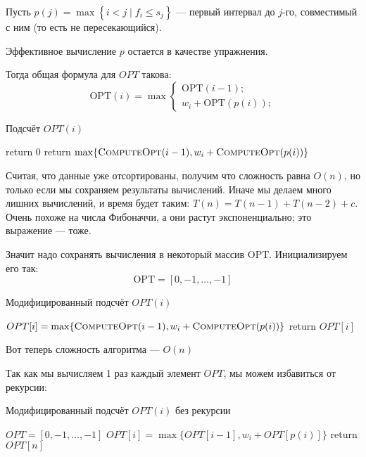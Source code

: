 Пусть $p(j) = \max\left\{ i<j \mid f_{i}\leqslant s_j\right\}$ --- первый интервал до $j$-го, совместимый с ним (то есть не пересекающийся).

Эффективное вычисление $p$ остается в качестве упражнения.

Тогда общая формула для $OPT$ такова:
\[
    \mathrm{OPT}(i) = \max\begin{cases}
        \mathrm{OPT}(i-1);\\
        w_i+ \mathrm{OPT}(p(i));
    \end{cases}
\]


\begin{algorithm}
	\caption{Подсчёт $OPT(i)$}
	\begin{algorithmic}[1]
				\State return 0
			\EndIf
			\State return \(\max \{\textsc{ComputeOpt}(i - 1), w_i + \textsc{ComputeOpt}(p(i))\}\)
		\EndFunction
	\end{algorithmic}
\end{algorithm}

Считая, что данные уже отсортированы, получим что сложность равна $O(n)$, но только если мы сохраняем результаты вычислений.
Иначе мы делаем много лишних вычислений, и время будет таким: $T(n) = T(n-1)+T(n-2)+c$.
Очень похоже на числа Фибоначчи, а они растут экспоненциально; это выражение --- тоже.


Значит надо сохранять вычисления в некоторый массив OPT.
Инициализируем его так: 
\[
\mathrm{OPT} = [0, -1, \ldots, -1]
\]

\begin{algorithm}
	\caption{Модифицированный подсчёт $OPT(i)$}
	\begin{algorithmic}[1]
				\State \(OPT[i] = \max \{\textsc{ComputeOpt}(i - 1), w_i + \textsc{ComputeOpt}(p(i))\}\)
			\EndIf
			\State return \(OPT[i]\)
		\EndFunction
	\end{algorithmic}
\end{algorithm}

Вот теперь сложность алгоритма --- $O(n)$

Так как мы вычисляем 1 раз каждый элемент $OPT$, мы можем избавиться от рекурсии:\\

\begin{algorithm}
	\caption{Модифицированный подсчёт $OPT(i)$ без рекурсии}
	\begin{algorithmic}[1]
			\State $OPT = [0, -1, \ldots, -1]$
				\State \(OPT[i] = \max \{OPT[i - 1], w_i + OPT[p(i)]\}\)
			\EndFor
			\State return \(OPT[n]\)
		\EndFunction
	\end{algorithmic}
\end{algorithm}

